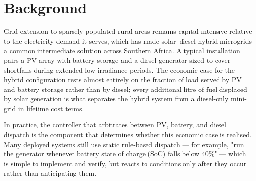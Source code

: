 \section{Background}
Grid extension to sparsely populated rural areas remains capital-intensive relative to the
electricity demand it serves, which has made solar--diesel hybrid microgrids a common
intermediate solution across Southern Africa. A typical installation pairs a PV array with
battery storage and a diesel generator sized to cover shortfalls during extended low-irradiance
periods. The economic case for the hybrid configuration rests almost entirely on the fraction
of load served by PV and battery storage rather than by diesel; every additional litre of fuel
displaced by solar generation is what separates the hybrid system from a diesel-only
mini-grid in lifetime cost terms.

In practice, the controller that arbitrates between PV, battery, and diesel dispatch is the
component that determines whether this economic case is realised. Many deployed systems still
use static rule-based dispatch --- for example, "run the generator whenever battery state of
charge (SoC) falls below 40\%" --- which is simple to implement and verify, but reacts to
conditions only after they occur rather than anticipating them.
